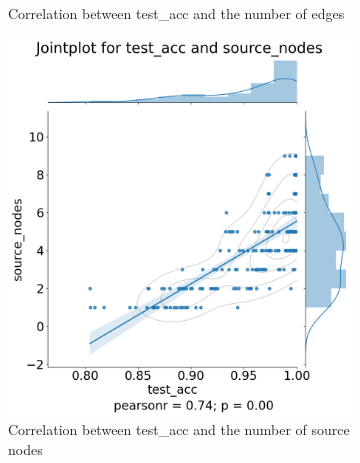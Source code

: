 \begin{figure}[H]
\begin{subfigure}{0.45\textwidth}
        \caption{Correlation between test\_acc and the number of edges} \label{fig:jp_gru_edge}
    \end{subfigure}%
  
    \bigskip
    \begin{subfigure}{0.45\textwidth}
        \includegraphics[width=\linewidth]{images/results/random/gru/jointplot_test_acc_source_nodes.png}
        \caption{Correlation between test\_acc and the number of source nodes} \label{fig:jp_gru_source}
    \end{subfigure}
    \hfill
    \begin{subfigure}{0.45\textwidth}

\end{subfigure}
\end{figure}
